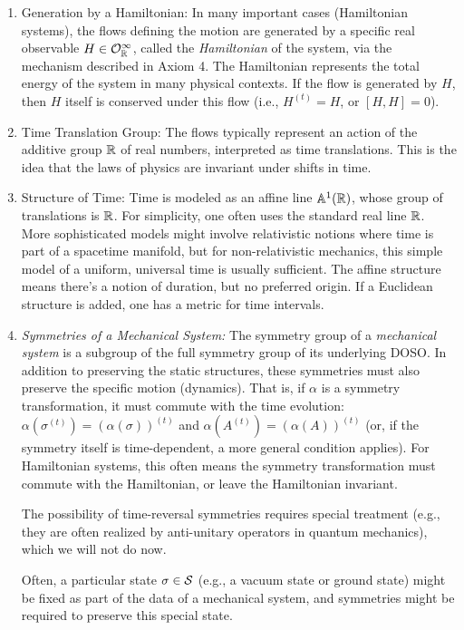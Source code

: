 \begin{remark} \label{rem:1.14}
\mbox{} %
\begin{enumerate}
\item Generation by a Hamiltonian: In many important cases (Hamiltonian systems), the flows defining the motion are generated by a specific real observable $H \in \mathcal{O}_{\mathbb{R}}^\infty$, called the \emph{Hamiltonian} of the system, via the mechanism described in Axiom 4. The Hamiltonian represents the total energy of the system in many physical contexts. If the flow is generated by $H$, then $H$ itself is conserved under this flow (i.e., $H^{(t)} = H$, or $[H,H]=0$). %

\item Time Translation Group: The flows typically represent an action of the additive group $\mathbb{R}$ of real numbers, interpreted as time translations. This is the idea that the laws of physics are invariant under shifts in time.

\item Structure of Time: Time is modeled as an affine line $\mathbb{A}^1(\mathbb{R})$, whose group of translations is $\mathbb{R}$. For simplicity, one often uses the standard real line $\mathbb{R}$. More sophisticated models might involve relativistic notions where time is part of a spacetime manifold, but for non-relativistic mechanics, this simple model of a uniform, universal time is usually sufficient. The affine structure means there's a notion of duration, but no preferred origin. If a Euclidean structure is added, one has a metric for time intervals.

\item \textit{Symmetries of a Mechanical System:} The symmetry group of a \emph{mechanical system} is a subgroup of the full symmetry group of its underlying DOSO. In addition to preserving the static structures, these symmetries must also preserve the specific motion (dynamics). That is, if $\alpha$ is a symmetry transformation, it must commute with the time evolution: $\alpha(\sigma^{(t)}) = (\alpha(\sigma))^{(t)}$ and $\alpha(A^{(t)}) = (\alpha(A))^{(t)}$ (or, if the symmetry itself is time-dependent, a more general condition applies). For Hamiltonian systems, this often means the symmetry transformation must commute with the Hamiltonian, or leave the Hamiltonian invariant.

The possibility of time-reversal symmetries requires special treatment (e.g., they are often realized by anti-unitary operators in quantum mechanics), which we will not do now.

Often, a particular state $\sigma \in \mathcal{S}$ (e.g., a vacuum state or ground state) might be fixed as part of the data of a mechanical system, and symmetries might be required to preserve this special state.
\end{enumerate}
\end{remark}

